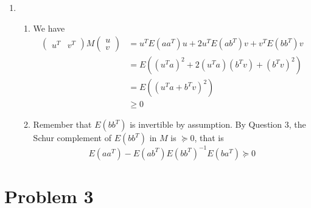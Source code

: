 \documentclass[a4paper,11pt]{article}
\begin{document}
\begin{enumerate}
  \item \begin{enumerate}
    \item We have 
    $$\begin{aligned}
      \begin{pmatrix}u^T & v^T \end{pmatrix} M \begin{pmatrix}u \\ v \end{pmatrix} 
      &= u^TE(aa^T)u + 2u^TE(ab^T)v + v^TE(bb^T)v \\
      &= E\left((u^Ta)^2+2(u^Ta)(b^Tv)+(b^Tv)^2 \right) \\
      &= E\left((u^Ta+b^Tv)^2 \right)\\
      &\geq 0
    \end{aligned}$$
    \item Remember that $E(bb^T)$ is invertible by assumption. By Question 3, the Schur complement of $E(bb^T)$ in $M$ is $\succeq 0$, that is $$E(aa^T)-E(ab^T) E(bb^T)^{-1} E(ba^T) \succeq 0$$
  \end{enumerate}
\end{enumerate}


\section*{Problem 3}
\end{document}
